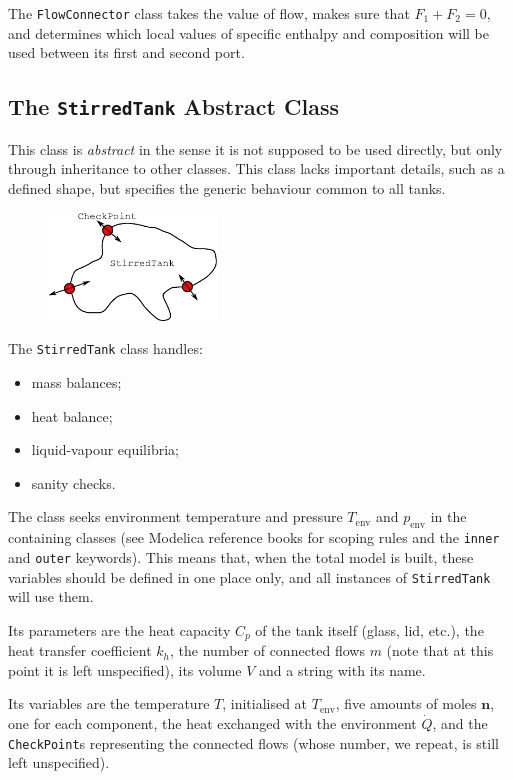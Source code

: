 \documentclass[a4paper]{article}
\begin{document}
The \texttt{FlowConnector} class takes the value of flow, makes sure that $F_1
+F_2=0$, and determines which local values of specific enthalpy and
composition will be used between its first and second port.


\subsection{The \texttt{StirredTank} Abstract Class}
This class is \emph{abstract} in the sense it is not supposed to be used
directly, but only through inheritance to other classes. This class lacks
important details, such as a defined shape, but specifies the generic behaviour
common to all tanks.

\begin{figure}[h]
\centering
\includegraphics[width=0.4\textwidth]{pics/stirredtank}
\end{figure}

The \texttt{StirredTank} class handles:
\begin{itemize}
\item mass balances;
\item heat balance;
\item liquid-vapour equilibria;
\item sanity checks.
\end{itemize}

The class seeks environment temperature and pressure $T_\text{env}$ and
$p_\text{env}$ in the containing classes (see Modelica reference books for
scoping rules and the \texttt{inner} and \texttt{outer} keywords). This means
that, when the total model is built, these variables should be defined in one
place only, and all instances of \texttt{StirredTank} will use them.

Its parameters are the heat capacity $C_p$ of the tank itself (glass, lid,
etc.), the heat transfer coefficient $k_h$, the number of connected flows $m$
(note that at this point it is left unspecified), its volume $V$ and a string
with its name.

Its variables are the temperature $T$, initialised at $T_\text{env}$, five
amounts of moles $\mathbf{n}$, one for each component, the heat exchanged with
the environment $\dot Q$, and the \texttt{CheckPoint}s representing the
connected flows (whose number, we repeat, is still left unspecified).
\end{document}
